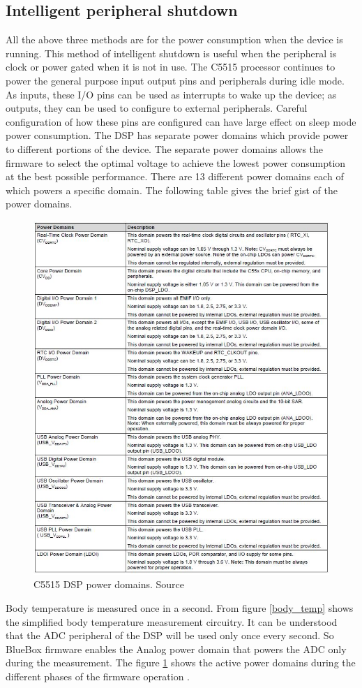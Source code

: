 \subsection{Intelligent peripheral shutdown}
All the above three methods are for the power consumption when the device is running. This method of intelligent shutdown is useful when the peripheral is clock or power gated when it is not in use. The C5515 processor continues to power the general purpose input output pins and peripherals during idle mode. As inputs, these I/O pins can be used as interrupts to wake 
up the device; as outputs, they can be used to configure to external peripherals. Careful configuration of how these pins are configured can have large effect on sleep mode power consumption. 
The DSP has separate power domains which provide power to different portions of the device. The separate power domains allows the firmware to select the optimal voltage to achieve the lowest power consumption at the best possible performance. There are 13 different power domains each of which powers a specific domain. The following table gives the brief gist of the power domains.
\begin{figure}
	\centering
	\includegraphics[scale = 1 ]{power_domain.JPG}
	\caption{C5515 DSP power domains. Source\cite{appref}\label{power_domain}}
\end{figure}
Body temperature is measured once in a second. From figure \ref{body_temp} shows the simplified body temperature measurement circuitry. It can be understood that the ADC peripheral of the DSP will be used only once every second. So BlueBox firmware enables the Analog power domain that powers the ADC only during the measurement. The figure \ref{power_domain} shows the active power domains during the different phases of the firmware operation .


